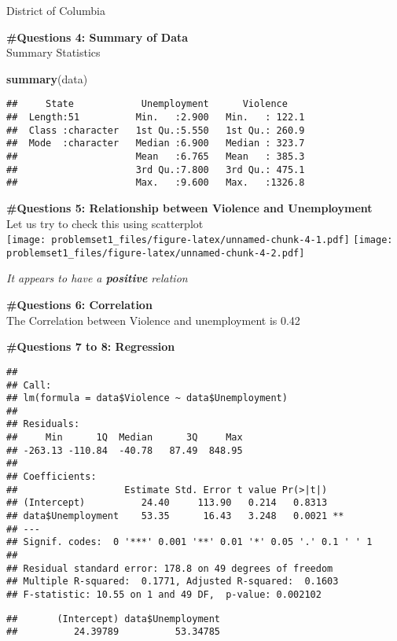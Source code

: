 \documentclass[
]{article}
\newenvironment{Shaded}{\begin{snugshade}}{\end{snugshade}}
\newcommand{\KeywordTok}[1]{\textcolor[rgb]{0.13,0.29,0.53}{\textbf{#1}}}
\newcommand{\NormalTok}[1]{#1}
\begin{document}
District of Columbia

\textbf{\#Questions 4: Summary of Data}\\
Summary Statistics

\begin{Shaded}
\begin{Highlighting}[]
\KeywordTok{summary}\NormalTok{(data)}
\end{Highlighting}
\end{Shaded}

\begin{verbatim}
##     State            Unemployment      Violence     
##  Length:51          Min.   :2.900   Min.   : 122.1  
##  Class :character   1st Qu.:5.550   1st Qu.: 260.9  
##  Mode  :character   Median :6.900   Median : 323.7  
##                     Mean   :6.765   Mean   : 385.3  
##                     3rd Qu.:7.800   3rd Qu.: 475.1  
##                     Max.   :9.600   Max.   :1326.8
\end{verbatim}

\textbf{\#Questions 5: Relationship between Violence and Unemployment}\\
Let us try to check this using scatterplot\\
\texttt{[image: problemset1\_files/figure-latex/unnamed-chunk-4-1.pdf]}
\texttt{[image: problemset1\_files/figure-latex/unnamed-chunk-4-2.pdf]}

\emph{It appears to have a \textbf{positive} relation}

\textbf{\#Questions 6: Correlation}\\
The Correlation between Violence and unemployment is 0.42

\textbf{\#Questions 7 to 8: Regression}

\begin{verbatim}
## 
## Call:
## lm(formula = data$Violence ~ data$Unemployment)
## 
## Residuals:
##     Min      1Q  Median      3Q     Max 
## -263.13 -110.84  -40.78   87.49  848.95 
## 
## Coefficients:
##                   Estimate Std. Error t value Pr(>|t|)   
## (Intercept)          24.40     113.90   0.214   0.8313   
## data$Unemployment    53.35      16.43   3.248   0.0021 **
## ---
## Signif. codes:  0 '***' 0.001 '**' 0.01 '*' 0.05 '.' 0.1 ' ' 1
## 
## Residual standard error: 178.8 on 49 degrees of freedom
## Multiple R-squared:  0.1771, Adjusted R-squared:  0.1603 
## F-statistic: 10.55 on 1 and 49 DF,  p-value: 0.002102
\end{verbatim}

\begin{verbatim}
##       (Intercept) data$Unemployment 
##          24.39789          53.34785
\end{verbatim}
\end{document}
